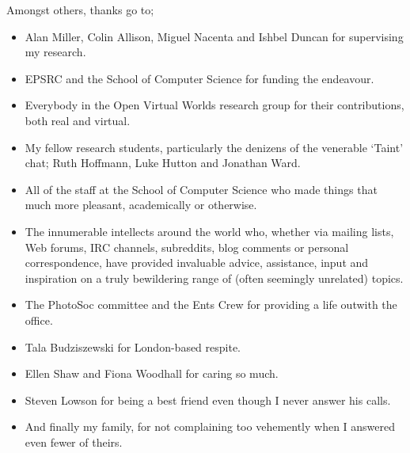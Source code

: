 Amongst others, thanks go to;

\begin{itemize}

	\item Alan Miller, Colin Allison, Miguel Nacenta and Ishbel Duncan for supervising my research.
	
	\item EPSRC and the School of Computer Science for funding the endeavour.
	
	\item Everybody in the Open Virtual Worlds research group for their contributions, both real and virtual.
	
	\item My fellow research students, particularly the denizens of the venerable `Taint' chat; Ruth Hoffmann, Luke Hutton and Jonathan Ward.
	
	\item All of the staff at the School of Computer Science who made things that much more pleasant, academically or otherwise.
	
	\item The innumerable intellects around the world who, whether via mailing lists, Web forums, IRC channels, subreddits, blog comments or personal correspondence, have provided invaluable advice, assistance, input and inspiration on a truly bewildering range of (often seemingly unrelated) topics.
	
	\item The PhotoSoc committee and the Ents Crew for providing a life outwith the office.
	
	\item Tala Budziszewski for London-based respite.
	
	\item Ellen Shaw and Fiona Woodhall for caring so much.
	
	\item Steven Lowson for being a best friend even though I never answer his calls.
	
	\item And finally my family, for not complaining too vehemently when I answered even fewer of theirs.

\end{itemize}